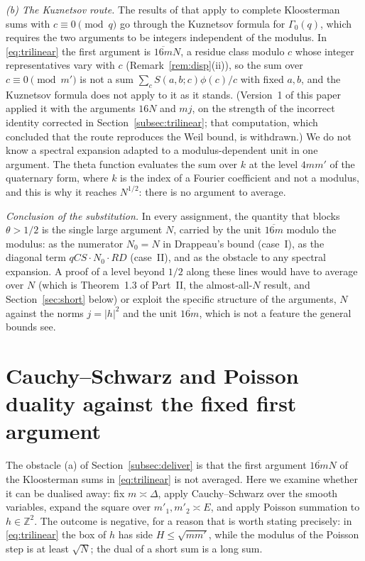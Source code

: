 \documentclass[11pt]{amsart}
\theoremstyle{remark}
\newcommand{\Z}{\mathbb{Z}}
\begin{document}
\emph{(b) The Kuznetsov route.} The results of \cite{DI} that apply to complete Kloosterman sums with $c\equiv0\pmod q$ go through the Kuznetsov formula for $\Gamma_0(q)$, which requires the two arguments to be integers independent of the modulus. In \eqref{eq:trilinear} the first argument is $\overline{16m}N$, a residue class modulo $c$ whose integer representatives vary with $c$ (Remark~\ref{rem:disp}(ii)), so the sum over $c\equiv0\pmod{m'}$ is not a sum $\sum_cS(a,b;c)\phi(c)/c$ with fixed $a,b$, and the Kuznetsov formula does not apply to it as it stands. (Version~1 of this paper applied it with the arguments $16N$ and $mj$, on the strength of the incorrect identity corrected in Section~\ref{subsec:trilinear}; that computation, which concluded that the route reproduces the Weil bound, is withdrawn.) We do not know a spectral expansion adapted to a modulus-dependent unit in one argument. The theta function evaluates the sum over $k$ at the level $4mm'$ of the quaternary form, where $k$ is the index of a Fourier coefficient and not a modulus, and this is why it reaches $N^{1/2}$: there is no argument to average.

\emph{Conclusion of the substitution.} In every assignment, the quantity that blocks $\theta>1/2$ is the single large argument $N$, carried by the unit $\overline{16m}$ modulo the modulus: as the numerator $N_0=N$ in Drappeau's bound (case~I), as the diagonal term $qCS\cdot N_0\cdot RD$ (case~II), and as the obstacle to any spectral expansion. A proof of a level beyond $1/2$ along these lines would have to average over $N$ (which is Theorem~1.3 of Part~II, the almost-all-$N$ result, and Section~\ref{sec:short} below) or exploit the specific structure of the arguments, $N$ against the norms $j=|h|^2$ and the unit $\overline{16m}$, which is not a feature the general bounds see.

\section{Cauchy--Schwarz and Poisson duality against the fixed first argument}\label{sec:poisson}

The obstacle (a) of Section~\ref{subsec:deliver} is that the first argument $\overline{16m}N$ of the Kloosterman sums in \eqref{eq:trilinear} is not averaged. Here we examine whether it can be dualised away: fix $m\asymp\Delta$, apply Cauchy--Schwarz over the smooth variables, expand the square over $m'_1,m'_2\asymp E$, and apply Poisson summation to $h\in\Z^2$. The outcome is negative, for a reason that is worth stating precisely: in \eqref{eq:trilinear} the box of $h$ has side $H\le\sqrt{mm'}$, while the modulus of the Poisson step is at least $\sqrt N$; the dual of a short sum is a long sum.
\end{document}
